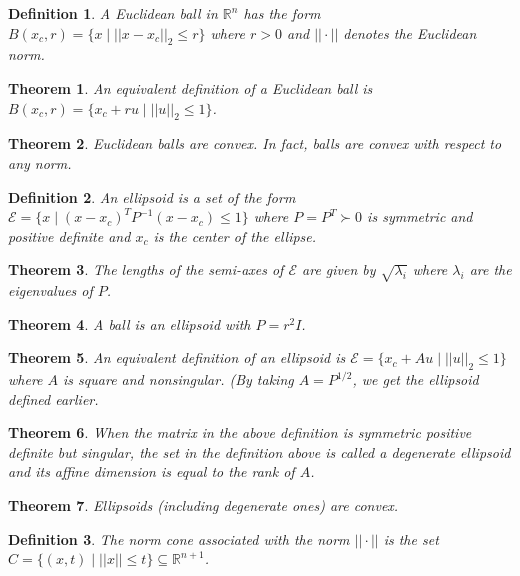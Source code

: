 \documentclass[a4paper]{article}
\newtheorem{mytheorem}{Theorem}
\newtheorem{mydef}{Definition}
\numberwithin{mytheorem}{section}
\numberwithin{mydef}{section}
\numberwithin{example}{section}
\begin{document}
\begin{mydef} A Euclidean ball in $\mathbb{R}^{n}$ has the form $B(x_{c},r) = \{ x \mid ||x-x_{c}||_{2} \leq r \}$ where $r > 0$ and $||\cdot ||$ denotes the Euclidean norm.\end{mydef}

\begin{mytheorem} An equivalent definition of a Euclidean ball is $ B(x_{c},r) = \{ x_{c} + ru \mid ||u||_{2} \leq 1 \} $.\end{mytheorem}

\begin{mytheorem} Euclidean balls are convex. In fact, balls are convex with respect to any norm. \end{mytheorem}

\begin{mydef} An ellipsoid is a set of the form $\mathcal{E} = \{ x \mid (x-x_{c})^{T}P^{-1}(x-x_{c}) \leq 1 \}$ where $P = P^{T} \succ 0 $ is symmetric and positive definite and $x_{c}$ is the center of the ellipse. \end{mydef}

\begin{mytheorem} The lengths of the semi-axes of $\mathcal{E}$ are given by $\sqrt{\lambda_{i}}$ where $\lambda_{i}$ are the eigenvalues of $P$.  \end{mytheorem}

\begin{mytheorem} A ball is an ellipsoid with $P = r^{2}I$.  \end{mytheorem}

\begin{mytheorem} An equivalent definition of an ellipsoid is $\mathcal{E} = \{ x_{c} + Au \mid ||u||_{2} \leq 1 \} $ where $A$ is square and nonsingular. (By taking $A = P^{1/2}$, we get the ellipsoid defined earlier. \end{mytheorem}

\begin{mytheorem} When the matrix in the above definition is symmetric positive definite but singular, the set in the definition above is called a degenerate ellipsoid and its affine dimension is equal to the rank of $A$.  \end{mytheorem}

\begin{mytheorem} Ellipsoids (including degenerate ones) are convex.  \end{mytheorem}

\begin{mydef} The norm cone associated with the norm $||\cdot||$ is the set $C = \{ (x,t) \mid ||x|| \leq t \} \subseteq \mathbb{R}^{n+1}$.  \end{mydef}
\end{document}
